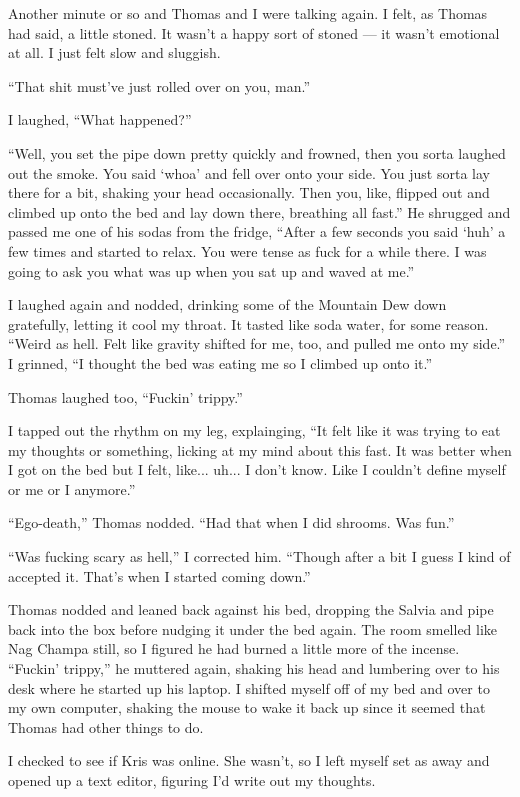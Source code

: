 Another minute or so and Thomas and I were talking again.  I felt, as Thomas had said, a little stoned.  It wasn't a happy sort of stoned --- it wasn't emotional at all.  I just felt slow and sluggish.

``That shit must've just rolled over on you, man.''

I laughed, ``What happened?''

``Well, you set the pipe down pretty quickly and frowned, then you sorta laughed out the smoke.  You said `whoa' and fell over onto your side.  You just sorta lay there for a bit, shaking your head occasionally.  Then you, like, flipped out and climbed up onto the bed and lay down there, breathing all fast.''  He shrugged and passed me one of his sodas from the fridge, ``After a few seconds you said `huh' a few times and started to relax.  You were tense as fuck for a while there.  I was going to ask you what was up when you sat up and waved at me.''

I laughed again and nodded, drinking some of the Mountain Dew down gratefully, letting it cool my throat.  It tasted like soda water, for some reason.  ``Weird as hell.  Felt like gravity shifted for me, too, and pulled me onto my side.''  I grinned, ``I thought the bed was eating me so I climbed up onto it.''

Thomas laughed too, ``Fuckin' trippy.''

I tapped out the rhythm on my leg, explainging, ``It felt like it was trying to eat my thoughts or something, licking at my mind about this fast.  It was better when I got on the bed but I felt, like... uh... I don't know.  Like I couldn't define myself or me or I anymore.''

``Ego-death,'' Thomas nodded.  ``Had that when I did shrooms.  Was fun.''

``Was fucking scary as hell,'' I corrected him.  ``Though after a bit I guess I kind of accepted it.  That's when I started coming down.''

Thomas nodded and leaned back against his bed, dropping the Salvia and pipe back into the box before nudging it under the bed again.  The room smelled like Nag Champa still, so I figured he had burned a little more of the incense.  ``Fuckin' trippy,'' he muttered again, shaking his head and lumbering over to his desk where he started up his laptop.  I shifted myself off of my bed and over to my own computer, shaking the mouse to wake it back up since it seemed that Thomas had other things to do.

I checked to see if Kris was online.  She wasn't, so I left myself set as away and opened up a text editor, figuring I'd write out my thoughts.

